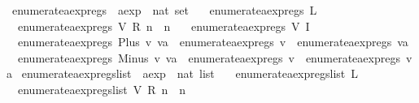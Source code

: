 \begin{isabellebody}
\isanewline
{}\isamarkupfalse%
\ enumerate{\isacharunderscore}aexp{\isacharunderscore}regs\ {\isacharcolon}{\isacharcolon}\ {\isachardoublequoteopen}aexp\ {\isasymRightarrow}\ nat\ set{\isachardoublequoteclose}\ \isanewline
\ \ {\isachardoublequoteopen}enumerate{\isacharunderscore}aexp{\isacharunderscore}regs\ {\isacharparenleft}L\ {\isacharunderscore}{\isacharparenright}\ {\isacharequal}\ {\isacharbraceleft}{\isacharbraceright}{\isachardoublequoteclose}\ {\isacharbar}\isanewline
\ \ {\isachardoublequoteopen}enumerate{\isacharunderscore}aexp{\isacharunderscore}regs\ {\isacharparenleft}V\ {\isacharparenleft}R\ n{\isacharparenright}{\isacharparenright}\ {\isacharequal}\ {\isacharbraceleft}n{\isacharbraceright}{\isachardoublequoteclose}\ {\isacharbar}\isanewline
\ \ {\isachardoublequoteopen}enumerate{\isacharunderscore}aexp{\isacharunderscore}regs\ {\isacharparenleft}V\ {\isacharparenleft}I\ {\isacharunderscore}{\isacharparenright}{\isacharparenright}\ {\isacharequal}\ {\isacharbraceleft}{\isacharbraceright}{\isachardoublequoteclose}\ {\isacharbar}\isanewline
\ \ {\isachardoublequoteopen}enumerate{\isacharunderscore}aexp{\isacharunderscore}regs\ {\isacharparenleft}Plus\ v\ va{\isacharparenright}\ {\isacharequal}\ enumerate{\isacharunderscore}aexp{\isacharunderscore}regs\ v\ {\isasymunion}\ enumerate{\isacharunderscore}aexp{\isacharunderscore}regs\ va{\isachardoublequoteclose}\ {\isacharbar}\isanewline
\ \ {\isachardoublequoteopen}enumerate{\isacharunderscore}aexp{\isacharunderscore}regs\ {\isacharparenleft}Minus\ v\ va{\isacharparenright}\ {\isacharequal}\ enumerate{\isacharunderscore}aexp{\isacharunderscore}regs\ v\ {\isasymunion}\ enumerate{\isacharunderscore}aexp{\isacharunderscore}regs\ va{\isachardoublequoteclose}\isanewline
\isanewline
{}\isamarkupfalse%
\ enumerate{\isacharunderscore}aexp{\isacharunderscore}regs{\isacharunderscore}list\ {\isacharcolon}{\isacharcolon}\ {\isachardoublequoteopen}aexp\ {\isasymRightarrow}\ nat\ list{\isachardoublequoteclose}\ \isanewline
\ \ {\isachardoublequoteopen}enumerate{\isacharunderscore}aexp{\isacharunderscore}regs{\isacharunderscore}list\ {\isacharparenleft}L\ {\isacharunderscore}{\isacharparenright}\ {\isacharequal}\ {\isacharbrackleft}{\isacharbrackright}{\isachardoublequoteclose}\ {\isacharbar}\isanewline
\ \ {\isachardoublequoteopen}enumerate{\isacharunderscore}aexp{\isacharunderscore}regs{\isacharunderscore}list\ {\isacharparenleft}V\ {\isacharparenleft}R\ n{\isacharparenright}{\isacharparenright}\ {\isacharequal}\ {\isacharbrackleft}n{\isacharbrackright}{\isachardoublequoteclose}\ {\isacharbar}\isanewline

\end{isabellebody}
